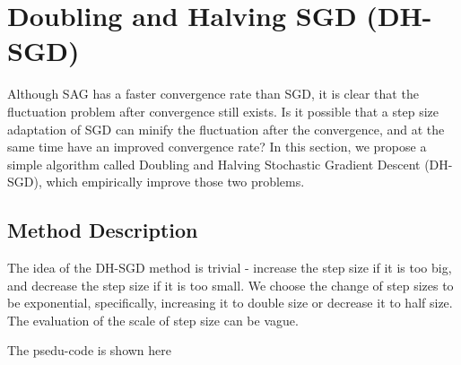 \section{Doubling and Halving SGD (DH-SGD)}
\label{sec: DH_SGD}

Although SAG has a faster convergence rate than SGD, it is clear that the fluctuation problem after convergence still exists. Is it possible that a step size adaptation of SGD can minify the fluctuation after the convergence, and at the same time have an improved convergence rate? In this section, we propose a simple algorithm called Doubling and Halving Stochastic Gradient Descent (DH-SGD), which empirically improve those two problems.

\subsection{Method Description}

The idea of the DH-SGD method is trivial - increase the step size if it is too big, and decrease the step size if it is too small. We choose the change of step sizes to be exponential, specifically, increasing it to double size or decrease it to half size. The evaluation of the scale of step size can be vague.  

The psedu-code is shown here


